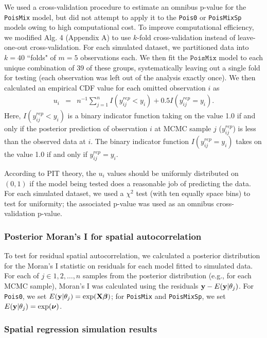 \documentclass[12pt,english]{article}
\begin{document}
\begin{spacing}{1.9}
We used a cross-validation procedure to estimate an omnibus p-value for the \texttt{PoisMix} model, but did not attempt to apply it to the \texttt{Pois0} or \texttt{PoisMixSp} models owing to high computational cost.  To improve computational efficiency, we modified Alg. 4 (Appendix A) to use $k$-fold cross-validation instead of leave-one-out cross-validation.
For each simulated dataset, we partitioned data into $k=40$ ``folds" of $m=5$ observations each.  We then fit the $\texttt{PoisMix}$ model to each unique combination of 39 of these groups, systematically leaving out a single fold for testing (each observation was left out of the analysis exactly once).  We then calculated an empirical CDF value for each omitted observation $i$ as
\begin{eqnarray*}
  u_i & = & n^{-1} \sum_{j=1}^n I(y_{ij}^{rep} < y_i) + 0.5 I(y_{ij}^{rep} = y_i).
\end{eqnarray*}
Here, $I(y_{ij}^{rep} < y_i)$ is a binary indicator function taking on the value 1.0 if and only if the posterior prediction of observation $i$ at MCMC sample $j$ ($y_{ij}^{rep}$) is less than the observed data at $i$.  The binary indicator function $I(y_{ij}^{rep} = y_i)$ takes on the value 1.0 if and only if $y_{ij}^{rep} = y_i$.

According to PIT theory, the $u_i$ values should be uniformly distributed on $(0,1)$ if the model being tested does a reasonable job of predicting the data. For each simulated dataset, we used a $\chi^2$ test (with ten equally space bins) to test for uniformity; the associated p-value was used as an omnibus cross-validation p-value.

\subsubsection{Posterior Moran's I for spatial autocorrelation}

To test for residual spatial autocorrelation, we calculated a posterior distribution for the Moran's I statistic on residuals for each model fitted to simulated data.  For each of $j \in 1,2,\hdots,n$ samples from the posterior distribution (e.g., for each MCMC sample), Moran's I was calculated using the residuals ${\bf y} - E({\bf y}|\theta_j)$.  For \texttt{Pois0}, we set $E({\bf y}|\theta_j) = \exp({\bf X} \boldsymbol{\beta})$; for \texttt{PoisMix} and \texttt{PoisMixSp}, we set $E({\bf y}|\theta_j) = \exp(\boldsymbol{\nu})$.


\subsubsection{Spatial regression simulation results}


\end{spacing}
\end{document}
